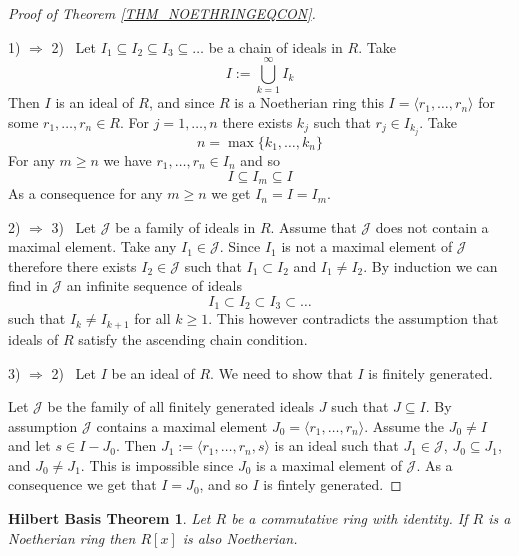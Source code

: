 \documentclass[12pt, letterpaper, oneside]{article}
\theoremstyle{plain}
\newtheorem{HBT}[theorem]{Hilbert Basis Theorem}
\theoremstyle{definition}
\newcommand{\subgp}[1]{\langle#1\rangle}
\newcommand{\vs}{\vskip 5mm}
\begin{document}
\begin{proof}[Proof of Theorem \ref{THM_NOETHRINGEQCON}]\ 

1) $\Rightarrow$ 2) \  Let  $I_{1}\subseteq I_{2}\subseteq I_{3} \subseteq \dots$
be a chain of ideals in $R$. Take 
$$I := \bigcup_{k=1}^{\infty} I_{k}$$
Then $I$ is an ideal of $R$, and since $R$ is a Noetherian ring this $I = \subgp{r_{1}, \dots, r_{n}}$
for some $r_{1}, \dots, r_{n}\in R$. For  $j=1, \dots, n$ there exists $k_{j}$ such that $r_{j}\in I_{k_{j}}$. 
Take 
$$n= \max\{k_{1}, \dots, k_{n}\}$$
For any  $m\geq n$ we have $r_{1}, \dots, r_{n}\in I_{n}$ and so 
$$I\subseteq I_{m} \subseteq I$$
As a consequence  for any $m\geq n$ we get  $I_{n} = I = I_{m}$. 

\vs


2) $\Rightarrow$ 3) \  Let  $\mathcal{J} $ be a family of ideals in $R$. 
Assume that $\mathcal{J}$ does not contain a maximal element.  Take any $I_{1}\in \mathcal{J}$. 
Since $I_{1}$ is not a maximal element of $\mathcal{J}$ therefore there exists $I_{2}\in \mathcal{J}$
such that $I_{1}\subset I_{2}$ and $I_{1}\neq I_{2}$. By induction we can find in $\mathcal{J}$
an infinite sequence of ideals 
$$I_{1}\subset I_{2} \subset I_{3} \subset \dots $$ 
such that  $I_{k}\neq I_{k+1}$ for all $k\geq 1$. 
This  however contradicts the assumption that ideals of $R$
satisfy the ascending chain condition. 

\vs

3) $\Rightarrow$ 2) \ Let $I$ be an ideal of $R$. We need to show that $I$ is finitely
generated. 

Let $\mathcal{J}$ be the family of all finitely generated ideals $J$ such that
$J\subseteq I$. By assumption $\mathcal{J}$ contains a maximal element 
$J_{0} = \subgp{r_{1}, \dots, r_{n}}$. Assume the $J_{0}\neq I$ and let $s\in I-J_{0}$. 
Then $J_{1} := \subgp{r_{1}, \dots, r_{n}, s}$ is an ideal such that $J_{1}\in \mathcal{J}$, 
$J_{0}\subseteq J_{1}$, and $J_{0}\neq J_{1}$. This is impossible 
since $J_{0}$  is a maximal element of $\mathcal J$. As a consequence we get that 
$I = J_{0}$, and so $I$ is fintely generated.  

\end{proof}

\vs\vs


\begin{HBT}
\label{THM_HBT}
Let $R$ be a commutative ring with identity. If $R$ is a Noetherian ring then $R[x]$
is also Noetherian. 
\end{HBT}
\end{document}
